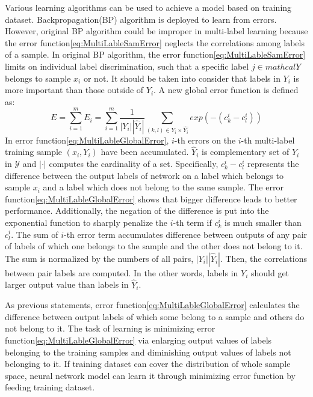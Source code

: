 Various learning algorithms can be used to achieve a model based on training dataset. Backpropagation(BP) algorithm is deployed to learn from errors. However, original BP algorithm could be improper in multi-label learning because the error function\ref{eq:MultiLableSamError} neglects the correlations among labels of a sample. In original BP algorithm, the error function\ref{eq:MultiLableSamError} limits on individual label discrimination, such that a specific label $j \in mathcal{Y}$ belongs to sample $x_{i}$ or not. It should be taken into consider that labels in $Y_{i}$ is more important than those outside of $Y_{i}$. A new global error function is defined as:
\begin{equation}\label{eq:MultiLableGlobalError}
E = \sum_{i=1}^m E_{i} = \sum_{i=1}^m \frac{1}{|Y_{i}||\hat{Y}_{i}|} \sum_{(k,l) \in Y_{i} \times \hat{Y_{i}}} exp(-(c_{k}^i-c_{l}^i))
\end{equation}
In error function\ref{eq:MultiLableGlobalError}, $i$-th errors on the $i$-th multi-label training sample $(x_{i},Y_{i})$ have been accumulated. $\hat{Y}_{i}$ is complementary set of $Y_{i}$ in $\mathcal{Y}$ and $|\cdot|$ computes the cardinality of a set. 
Specifically, $c_{k}^i-c_{l}^i$ represents the difference between the output labels of network on a label which belongs to sample $x_{i}$ and a label which does not belong to the same sample. The error function\ref{eq:MultiLableGlobalError} shows that bigger difference leads to better performance. Additionally, the negation of the difference is put into the exponential function to sharply penalize the $i$-th term if $c_{k}^i$ is much smaller than $c_{l}^i$. The sum of $i$-th error term accumulates difference between outputs of any pair of labels of which one belongs to the sample and the other does not belong to it. The sum is normalized by the numbers of all pairs, $|Y_{i}||\hat{Y}_{i}|$. Then, the correlations between pair labels are computed. In the other words, labels in $Y_{i}$ should get larger output value than labels in $\hat{Y}_{i}$.

As previous statements, error function\ref{eq:MultiLableGlobalError} calculates the difference between output labels of which some belong to a sample and others do not belong to it. The task of learning is minimizing error function\ref{eq:MultiLableGlobalError} via enlarging output values of labels belonging to the training samples and diminishing output values of labels not belonging to it. If training dataset can cover the distribution of whole sample space, neural network model can learn it through minimizing error function by feeding training dataset.


